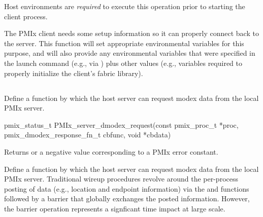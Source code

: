 \advicermstart
Host environments are \textit{required} to execute this operation prior to starting the client process.
\advicermend

The \ac{PMIx} client needs some setup information so it can properly connect back to the server.
This function will set appropriate environmental variables for this purpose, and will also provide any environmental variables that were specified in the launch command (e.g., via ) plus other values (e.g., variables required to properly initialize the client's fabric library).


\subsection{}

\summary

Define a function by which the host server can request modex data from the local PMIx server.

\format

\cspecificstart
\begin{codepar}
pmix_status_t PMIx_server_dmodex_request(const pmix_proc_t *proc,
                        pmix_dmodex_response_fn_t cbfunc,
                        void *cbdata)
\end{codepar}
\cspecificend

\begin{arglist}
\end{arglist}

Returns  or a negative value corresponding to a PMIx error constant.

\descr

Define a function by which the host server can request modex data from the local \ac{PMIx} server. Traditional wireup procedures revolve around the per-process posting of data (e.g., location and endpoint information) via the  and  functions followed by a  barrier that globally exchanges the posted information. However, the barrier operation represents a signficant time impact at large scale.

